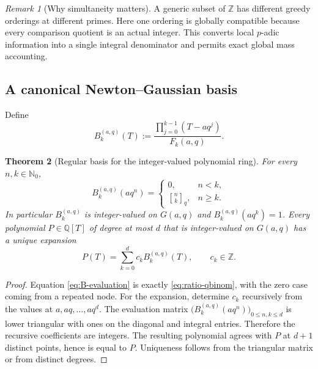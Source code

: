 \documentclass[11pt]{article}
\newtheorem{theorem}{Theorem}[section]
\theoremstyle{definition}
\theoremstyle{remark}
\newtheorem{remark}[theorem]{Remark}
\newcommand{\N}{\mathbb N}
\newcommand{\Z}{\mathbb Z}
\newcommand{\Q}{\mathbb Q}
\newcommand{\qbinom}[3]{\genfrac{[}{]}{0pt}{}{#1}{#2}_{#3}}
\begin{document}
\begin{remark}[Why simultaneity matters]
A generic subset of $\Z$ has different greedy orderings at different primes.
Here one ordering is globally compatible because every comparison quotient is
an actual integer.  This converts local $p$-adic information into a single
integral denominator and permits exact global mass accounting.
\end{remark}

\subsection{A canonical Newton--Gaussian basis}

Define
\begin{equation}\label{eq:Bk}
 B_k^{(a,q)}(T)
 :=\frac{\prod_{j=0}^{k-1}(T-aq^j)}{F_k(a,q)}.
\end{equation}

\begin{theorem}[Regular basis for the integer-valued polynomial ring]
\label{thm:regular-basis}
For every $n,k\in\N_0$,
\begin{equation}\label{eq:B-evaluation}
 B_k^{(a,q)}(aq^n)=
 \begin{cases}
   0,&n<k,\\[2mm]
   \qbinom{n}{k}{q},&n\geq k.
 \end{cases}
\end{equation}
In particular $B_k^{(a,q)}$ is integer-valued on $G(a,q)$ and
$B_k^{(a,q)}(aq^k)=1$.  Every polynomial $P\in\Q[T]$ of degree at most $d$
that is integer-valued on $G(a,q)$ has a unique expansion
\begin{equation}\label{eq:regular-expansion}
 P(T)=\sum_{k=0}^{d}c_k B_k^{(a,q)}(T),
 \qquad c_k\in\Z.
\end{equation}
\end{theorem}

\begin{proof}
Equation \eqref{eq:B-evaluation} is exactly
\eqref{eq:ratio-qbinom}, with the zero case coming from a repeated node.  For
the expansion, determine $c_k$ recursively from the values at
$a,aq,\ldots,aq^d$.  The evaluation matrix
$\bigl(B_k^{(a,q)}(aq^n)\bigr)_{0\leq n,k\leq d}$ is lower triangular with
ones on the diagonal and integral entries.  Therefore the recursive
coefficients are integers.  The resulting polynomial agrees with $P$ at
$d+1$ distinct points, hence is equal to $P$.  Uniqueness follows from the
triangular matrix or from distinct degrees.
\end{proof}
\end{document}
